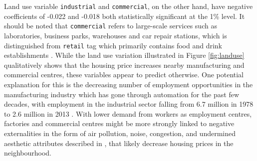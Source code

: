\documentclass{article}
\begin{document}
Land use variable \texttt{industrial} and \texttt{commercial}, on the other hand, have negative coefficients of -0.022 and -0.018 both statistically significant at the 1\% level. It should be noted that \texttt{commercial} refers to large-scale services such as laboratories, business parks, warehouses and car repair stations, which is distinguished from \texttt{retail} tag which primarily contains food and drink establishments \citep{OpenStreetMapTag:landuse=commercial}. While the land use variation illustrated in Figure \ref{fig:landuse} qualitatively shows that the housing price increases nearby manufacturing and commercial centres, these variables appear to predict otherwise. One potential explanation for this is the decreasing number of employment opportunities in the manufacturing industry which has gone through automation for the past few decades, with employment in the industrial sector falling from 6.7 million in 1978 to 2.6 million in 2013 \citep{Jackson2018ManufacturingYears}. With lower demand from workers as employment centres, factories and commercial centres might be more strongly linked to negative externalities in the form of air pollution, noise, congestion, and undermined aesthetic attributes described in \citet{Orford1998ValuingMarket}, that likely decrease housing prices in the neighbourhood.\\\\
\end{document}
